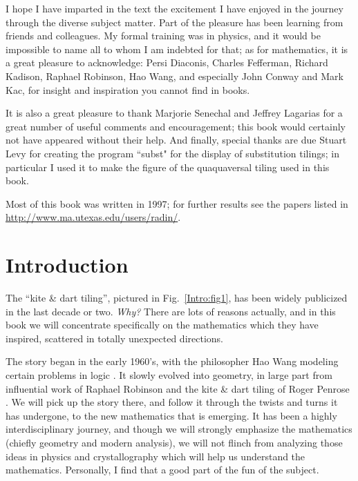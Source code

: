 \documentclass[reqno]{stml-l}
\theoremstyle{plain}
\theoremstyle{definition}
\numberwithin{equation}{chapter}
\begin{document}
I hope I have imparted in the text the excitement I have
enjoyed in the journey through the diverse subject matter.
Part of the pleasure has been learning from friends and
colleagues. My formal training was in physics, and it would
be impossible to name all to whom I am indebted for that;
as for mathematics, it is a great pleasure to acknowledge:
Persi Diaconis, Charles Fefferman, Richard Kadison, Raphael
Robinson, Hao Wang, and especially John Conway and Mark
Kac, for insight and inspiration you cannot find in books.

It is also a great pleasure to thank Marjorie Senechal and
Jeffrey Lagarias for a great number of useful comments and
encouragement; this book would certainly not have appeared
without their help. And finally, special thanks are due
Stuart Levy for creating the program ``subst" for the
display of substitution tilings; in particular I used it to
make the figure of the quaquaversal tiling used in this
book.

Most of this book was written in 1997; for further results
see the papers listed in
\url{http://www.ma.utexas.edu/users/radin/}.

\mainmatter

\chapter*{Introduction}

The ``kite \& dart tiling'', pictured in Fig.~\ref{Intro:fig1}, has been widely
publicized in the last decade or two. \emph{Why?} There are
lots of reasons actually, and in this book we will
concentrate specifically on the mathematics which they have
inspired, scattered in totally unexpected directions.

The story began in the early 1960's, with the philosopher
Hao Wang modeling certain problems in logic \cite{bib:Wan}.
It slowly evolved into geometry, in large part from
influential work of Raphael Robinson \cite{bib:Rob} and the
kite \& dart tiling of Roger Penrose \cite{bib:Gar}. We
will pick up the story there, and follow it through the
twists and turns it has undergone, to the new mathematics
that is emerging. It has been a highly interdisciplinary
journey, and though we will strongly emphasize the
mathematics (chiefly geometry and modern analysis), we will
not flinch from analyzing those ideas in physics and
crystallography which will help us understand the
mathematics. Personally, I find that a good part of the fun
of the subject.
\end{document}
